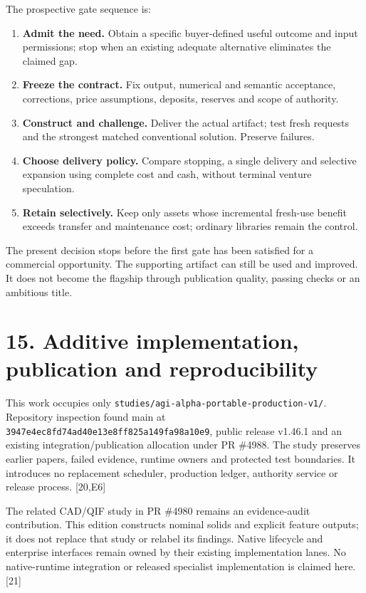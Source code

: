 \documentclass[11pt,letterpaper]{article}
\providecommand{\tightlist}{\setlength{\itemsep}{2pt}\setlength{\parskip}{0pt}}
\begin{document}
The prospective gate sequence is:

\begin{enumerate}
\def\labelenumi{\arabic{enumi}.}
\tightlist
\item
  \textbf{Admit the need.} Obtain a specific buyer-defined useful outcome and input permissions; stop when an existing adequate alternative eliminates the claimed gap.
\item
  \textbf{Freeze the contract.} Fix output, numerical and semantic acceptance, corrections, price assumptions, deposits, reserves and scope of authority.
\item
  \textbf{Construct and challenge.} Deliver the actual artifact; test fresh requests and the strongest matched conventional solution. Preserve failures.
\item
  \textbf{Choose delivery policy.} Compare stopping, a single delivery and selective expansion using complete cost and cash, without terminal venture speculation.
\item
  \textbf{Retain selectively.} Keep only assets whose incremental fresh-use benefit exceeds transfer and maintenance cost; ordinary libraries remain the control.
\end{enumerate}

The present decision stops before the first gate has been satisfied for a commercial opportunity. The supporting artifact can still be used and improved. It does not become the flagship through publication quality, passing checks or an ambitious title.

\hypertarget{additive-implementation-publication-and-reproducibility}{%
\section{15. Additive implementation, publication and reproducibility}\label{additive-implementation-publication-and-reproducibility}}

This work occupies only \nolinkurl{studies/agi-alpha-portable-production-v1/}. Repository inspection found main at \nolinkurl{3947e4ec8fd74ad40e13e8ff825a149fa98a10e9}, public release v1.46.1 and an existing integration/publication allocation under PR \#4988. The study preserves earlier papers, failed evidence, runtime owners and protected test boundaries. It introduces no replacement scheduler, production ledger, authority service or release process. {[}20,E6{]}

The related CAD/QIF study in PR \#4980 remains an evidence-audit contribution. This edition constructs nominal solids and explicit feature outputs; it does not replace that study or relabel its findings. Native lifecycle and enterprise interfaces remain owned by their existing implementation lanes. No native-runtime integration or released specialist implementation is claimed here. {[}21{]}
\end{document}
